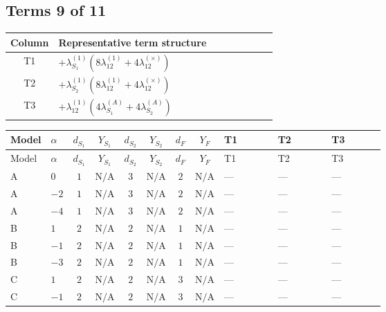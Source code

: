 \documentclass[8pt]{article}
\begin{document}
\begin{landscape}
\subsection*{Terms 9 of 11}
\begin{center}
\begin{tabular}{@{}c >{\raggedright\arraybackslash}p{0.82\linewidth}@{}}
\toprule
Column & Representative term structure \\
\midrule
T1 & \(\displaystyle +{\lambda_{S_1}^{(1)}} (8 {\lambda_{12}^{(1)}}+4 {\lambda_{12}^{(\times)}})\) \\
\midrule
T2 & \(\displaystyle +{\lambda_{S_2}^{(1)}} (8 {\lambda_{12}^{(1)}}+4 {\lambda_{12}^{(\times)}})\) \\
\midrule
T3 & \(\displaystyle +{\lambda_{12}^{(1)}} (4 {\lambda_{S_1}^{(A)}}+4 {\lambda_{S_2}^{(A)}})\) \\
\midrule
\bottomrule
\end{tabular}
\end{center}
\smallskip
\tiny
\begin{longtable}{@{}llcccccc >{\raggedright\arraybackslash}p{0.21\linewidth} >{\raggedright\arraybackslash}p{0.21\linewidth} >{\raggedright\arraybackslash}p{0.21\linewidth}@{}}
\toprule
Model & $\alpha$ & $d_{S_1}$ & $Y_{S_1}$ & $d_{S_2}$ & $Y_{S_2}$ & $d_F$ & $Y_F$ & T1 & T2 & T3 \\
\midrule
\endfirsthead
\toprule
Model & $\alpha$ & $d_{S_1}$ & $Y_{S_1}$ & $d_{S_2}$ & $Y_{S_2}$ & $d_F$ & $Y_F$ & T1 & T2 & T3 \\
\midrule
\endhead
A & $0$ & $1$ & $\text{N/A}$ & $3$ & $\text{N/A}$ & $2$ & $\text{N/A}$ & --- & --- & --- \\
\midrule
A & $-2$ & $1$ & $\text{N/A}$ & $3$ & $\text{N/A}$ & $2$ & $\text{N/A}$ & --- & --- & --- \\
\midrule
A & $-4$ & $1$ & $\text{N/A}$ & $3$ & $\text{N/A}$ & $2$ & $\text{N/A}$ & --- & --- & --- \\
\midrule
B & $1$ & $2$ & $\text{N/A}$ & $2$ & $\text{N/A}$ & $1$ & $\text{N/A}$ & --- & --- & --- \\
\midrule
B & $-1$ & $2$ & $\text{N/A}$ & $2$ & $\text{N/A}$ & $1$ & $\text{N/A}$ & --- & --- & --- \\
\midrule
B & $-3$ & $2$ & $\text{N/A}$ & $2$ & $\text{N/A}$ & $1$ & $\text{N/A}$ & --- & --- & --- \\
\midrule
C & $1$ & $2$ & $\text{N/A}$ & $2$ & $\text{N/A}$ & $3$ & $\text{N/A}$ & --- & --- & --- \\
\midrule
C & $-1$ & $2$ & $\text{N/A}$ & $2$ & $\text{N/A}$ & $3$ & $\text{N/A}$ & --- & --- & --- \\

\end{longtable}
\end{landscape}
\end{document}
